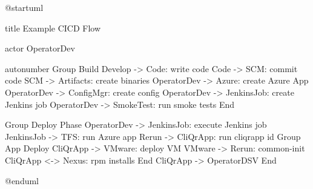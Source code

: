 @startuml

title Example CICD Flow

actor OperatorDev

autonumber
Group Build
  Develop -> Code: write code
  Code -> SCM: commit code
  SCM -> Artifacts: create binaries
  OperatorDev -> Azure: create Azure App
  OperatorDev -> ConfigMgr: create config
  OperatorDev -> JenkinsJob: create Jenkins job
  OperatorDev -> SmokeTest: run smoke tests
End

Group Deploy Phase
  OperatorDev -> JenkinsJob: execute Jenkins job
  JenkinsJob -> TFS: run Azure app
  Rerun -> CliQrApp: run cliqrapp id
  Group App Deploy
    CliQrApp -> VMware: deploy VM
    VMware -> Rerun: common-init
    CliQrApp <-> Nexus: rpm installs
  End
  CliQrApp -> OperatorDSV
End


@enduml
